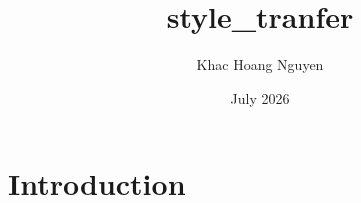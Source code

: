 \documentclass{article}
\title{style_tranfer}
\author{Khac Hoang Nguyen}
\date{July 2026}
\begin{document}
\maketitle

\section{Introduction}
\end{document}
